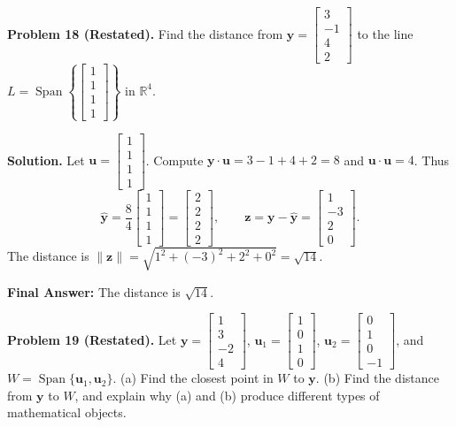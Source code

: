 \documentclass[11pt, letterpaper]{article}
\theoremstyle{definition}
\theoremstyle{remark}
\newcommand{\R}{\mathbb{R}}
\begin{document}
\medskip
\textbf{Problem 18 (Restated).} Find the distance from $\mathbf{y} = \begin{bmatrix} 3 \\ -1 \\ 4 \\ 2 \end{bmatrix}$ to the line $L = \operatorname{Span}\left\{\begin{bmatrix} 1 \\ 1 \\ 1 \\ 1 \end{bmatrix}\right\}$ in $\R^4$.

\textbf{Solution.}
Let $\mathbf{u} = \begin{bmatrix} 1 \\ 1 \\ 1 \\ 1 \end{bmatrix}$. Compute $\mathbf{y}\cdot\mathbf{u} = 3 - 1 + 4 + 2 = 8$ and $\mathbf{u}\cdot\mathbf{u} = 4$. Thus
\[
\hat{\mathbf{y}} = \frac{8}{4}\begin{bmatrix} 1 \\ 1 \\ 1 \\ 1 \end{bmatrix} = \begin{bmatrix} 2 \\ 2 \\ 2 \\ 2 \end{bmatrix}, \qquad \mathbf{z} = \mathbf{y} - \hat{\mathbf{y}} = \begin{bmatrix} 1 \\ -3 \\ 2 \\ 0 \end{bmatrix}.
\]
The distance is $\|\mathbf{z}\| = \sqrt{1^2 + (-3)^2 + 2^2 + 0^2} = \sqrt{14}$.

\textbf{Final Answer:} The distance is $\sqrt{14}$.

\medskip
\textbf{Problem 19 (Restated).} Let $\mathbf{y} = \begin{bmatrix} 1 \\ 3 \\ -2 \\ 4 \end{bmatrix}$, $\mathbf{u}_1 = \begin{bmatrix} 1 \\ 0 \\ 1 \\ 0 \end{bmatrix}$, $\mathbf{u}_2 = \begin{bmatrix} 0 \\ 1 \\ 0 \\ -1 \end{bmatrix}$, and $W = \operatorname{Span}\{\mathbf{u}_1, \mathbf{u}_2\}$. (a) Find the closest point in $W$ to $\mathbf{y}$. (b) Find the distance from $\mathbf{y}$ to $W$, and explain why (a) and (b) produce different types of mathematical objects.
\end{document}
